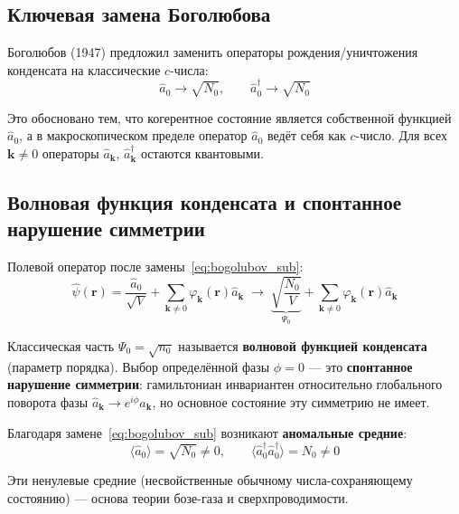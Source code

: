 \documentclass[../general/general]{subfiles}
\begin{document}
\subsection{Ключевая замена Боголюбова}

Боголюбов (1947) предложил заменить операторы рождения/уничтожения конденсата на классические $c$-числа:
\begin{equation}
    \boxed{\hat{a}_0 \to \sqrt{N_0}, \qquad \hat{a}^\dagger_0 \to \sqrt{N_0}}
    \label{eq:bogolubov_sub}
\end{equation}

Это обосновано тем, что когерентное состояние является собственной функцией $\hat{a}_0$, а в макроскопическом пределе оператор $\hat{a}_0$ ведёт себя как $c$-число. Для всех $\mathbf{k} \neq 0$ операторы $\hat{a}_\mathbf{k}$, $\hat{a}^\dagger_\mathbf{k}$ остаются квантовыми.

\subsection{Волновая функция конденсата и спонтанное нарушение симметрии}

Полевой оператор после замены~\eqref{eq:bogolubov_sub}:
\begin{equation}
    \hat{\psi}(\mathbf{r}) = \frac{\hat{a}_0}{\sqrt{V}} + \sum_{\mathbf{k}\neq 0}\varphi_\mathbf{k}(\mathbf{r})\hat{a}_\mathbf{k} \;\longrightarrow\; \underbrace{\sqrt{\frac{N_0}{V}}}_{\Psi_0} + \sum_{\mathbf{k}\neq 0}\varphi_\mathbf{k}(\mathbf{r})\hat{a}_\mathbf{k}
\end{equation}

Классическая часть $\Psi_0 = \sqrt{n_0}$ называется \textbf{волновой функцией конденсата} (параметр порядка). Выбор определённой фазы $\phi = 0$ --- это \textbf{спонтанное нарушение симметрии}: гамильтониан инвариантен относительно глобального поворота фазы $\hat{a}_\mathbf{k} \to e^{i\phi}\hat{a}_\mathbf{k}$, но основное состояние эту симметрию не имеет.

Благодаря замене~\eqref{eq:bogolubov_sub} возникают \textbf{аномальные средние}:
\begin{equation}
    \langle\hat{a}_0\rangle = \sqrt{N_0} \neq 0, \qquad \langle\hat{a}^\dagger_0\hat{a}^\dagger_0\rangle = N_0 \neq 0
\end{equation}

Эти ненулевые средние (несвойственные обычному числа-сохраняющему состоянию) --- основа теории бозе-газа и сверхпроводимости.

\end{document}
